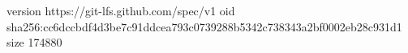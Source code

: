 version https://git-lfs.github.com/spec/v1
oid sha256:cc6dccbdf4d3be7c91ddcea793c0739288b5342c738343a2bf0002eb28c931d1
size 174880
